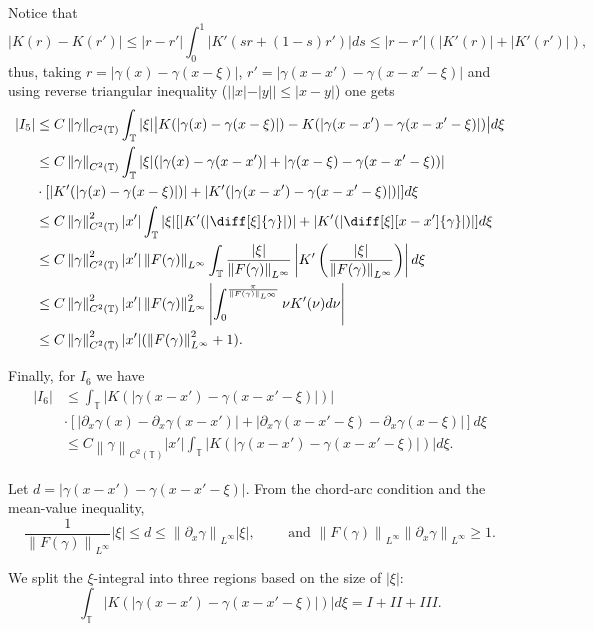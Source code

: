\documentclass[a4paper]{amsart}
\theoremstyle{definition}
\newcommand{\T}{\ensuremath{\mathbb{T}}}
\newcommand{\Np}[2][\infty]{\ensuremath{\left\|#2\right\|_{L^#1}}}
\newcommand{\Ck}[2][2]{\ensuremath{\left\|#2\right\|_{C^#1(\T)}}}
\begin{document}
    Notice that 
    \begin{equation}\label{eq:diferenciaKernelsRTI}
        |K(r)-K(r')| \leq  |r-r'|\int_0^1 |K'(s r + (1-s) r')|ds\leq |r-r'| (|K'(r)|+|K'(r')|),
    \end{equation}    
    thus, taking $r=|\gamma(x)-\gamma(x-\xi)|$, $r'=|\gamma(x-x')-\gamma(x-x'-\xi)|$ and using reverse triangular inequality ($||x|-|y||\leq |x-y| $) one gets 
    {\allowdisplaybreaks
    \begin{align*}
        |I_5|&\leq C\Ck{\gamma} \int_\T |\xi|\big|K(|\gamma(x)-\gamma(x-\xi)|)-K(|\gamma(x-x')-\gamma(x-x'-\xi)|)\big| d\xi \\       
        &\leq C\Ck{\gamma} \int_\T |\xi|(|\gamma(x)-\gamma(x-x')| + |\gamma(x-\xi)-\gamma(x-x'-\xi))| \\&\cdot [|K'(|\gamma(x)-\gamma(x-\xi)|)|+|K'(|\gamma(x-x')-\gamma(x-x'-\xi)|)|]d\xi\\
        &\leq C\Ck{\gamma}^2 |x'| \int_\T |\xi| [|K'(|\diff[\xi]{\gamma}|)|+|K'(|\diff[\xi][x-x']{\gamma}|)|]d\xi \\
        &\leq C\Ck{\gamma}^2 |x'| \Np{F(\gamma)} \int_\T \frac{|\xi|}{\Np{F(\gamma)}} \left|K'\left(\frac{|\xi|}{\Np{F(\gamma)}}\right)\right|d\xi \\
        &\leq C\Ck{\gamma}^2 |x'| \Np{F(\gamma)}^2 \left|\int_0^{\frac{\pi}{\Np{F(\gamma)}}} \nu K'(\nu) d\nu \right| \\&\leq C\Ck{\gamma}^2 |x'| (\Np{F(\gamma)}^2 + 1).
    \end{align*}}

    
    Finally, for $I_6$ we have 
    \begin{align*}
        |I_6|&\leq \int_\T |K(|\gamma(x-x')-\gamma(x-x'-\xi)|)| \\ & \cdot  [|\partial_x\gamma(x)-\partial_x\gamma(x-x')|+|\partial_x\gamma(x-x'-\xi)-\partial_x\gamma(x-\xi)|]d\xi\\
        &\leq C \Ck{\gamma} |x'| \int_\T |K(|\gamma(x-x')-\gamma(x-x'-\xi)|)| d\xi.
    \end{align*}

    Let \(d = |\gamma(x-x')-\gamma(x-x'-\xi)|\). From the chord‑arc condition and the mean-value inequality,
    \[
    \frac{1}{\Np{F(\gamma)}}|\xi| \le d \le \Np{\partial_x\gamma}|\xi|,\qquad \text{ and } \Np{F(\gamma)}\Np{\partial_x\gamma}\geq 1.
    \]
    
    We split the \(\xi\)-integral into three regions based on the size of \(|\xi|\):
    \begin{equation}\label{eq:splitKernel3regions}
        \int_\T |K(|\gamma(x-x')-\gamma(x-x'-\xi)|)| d\xi = I + II + III.
    \end{equation}
    
\end{document}
